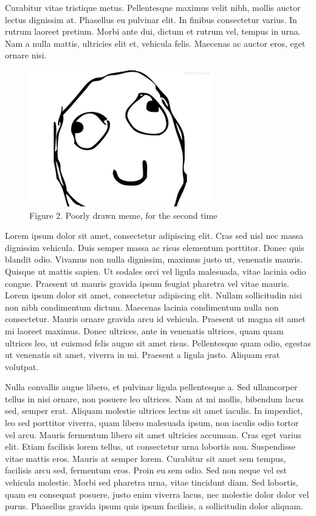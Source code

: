 \documentclass{article}
\begin{document}
 Curabitur vitae tristique metus. Pellentesque maximus velit nibh, mollis auctor lectus dignissim at. Phasellus eu pulvinar elit. In finibus consectetur varius. In rutrum laoreet pretium. Morbi ante dui, dictum et rutrum vel, tempus in urna. Nam a nulla mattis, ultricies elit et, vehicula felis. Maecenas ac auctor eros, eget ornare nisi. 


\begin{figure}[h]
\centering
\includegraphics{meme.png}
\captionsetup{labelformat=empty} \caption{Figure 2. Poorly drawn meme, for the second time}
\end{figure}


 Lorem ipsum dolor sit amet, consectetur adipiscing elit. Cras sed nisl nec massa dignissim vehicula. Duis semper massa ac risus elementum porttitor. Donec quis blandit odio. Vivamus non nulla dignissim, maximus justo ut, venenatis mauris. Quisque ut mattis sapien. Ut sodales orci vel ligula malesuada, vitae lacinia odio congue. Praesent ut mauris gravida ipsum feugiat pharetra vel vitae mauris. Lorem ipsum dolor sit amet, consectetur adipiscing elit. Nullam sollicitudin nisi non nibh condimentum dictum. Maecenas lacinia condimentum nulla non consectetur. Mauris ornare gravida arcu id vehicula. Praesent ut magna sit amet mi laoreet maximus. Donec ultrices, ante in venenatis ultrices, quam quam ultrices leo, ut euismod felis augue sit amet risus. Pellentesque quam odio, egestas ut venenatis sit amet, viverra in mi. Praesent a ligula justo. Aliquam erat volutpat. 



 Nulla convallis augue libero, et pulvinar ligula pellentesque a. Sed ullamcorper tellus in nisi ornare, non posuere leo ultrices. Nam at mi mollis, bibendum lacus sed, semper erat. Aliquam molestie ultrices lectus sit amet iaculis. In imperdiet, leo sed porttitor viverra, quam libero malesuada ipsum, non iaculis odio tortor vel arcu. Mauris fermentum libero sit amet ultricies accumsan. Cras eget varius elit. Etiam facilisis lorem tellus, ut consectetur urna lobortis non. Suspendisse vitae mattis eros. Mauris at semper lorem. Curabitur sit amet sem tempus, facilisis arcu sed, fermentum eros. Proin eu sem odio. Sed non neque vel est vehicula molestie. Morbi sed pharetra urna, vitae tincidunt diam. Sed lobortis, quam eu consequat posuere, justo enim viverra lacus, nec molestie dolor dolor vel purus. Phasellus gravida ipsum quis ipsum facilisis, a sollicitudin dolor aliquam. 
\end{document}
